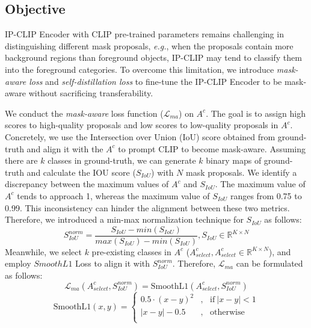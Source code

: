 \subsection{Objective}
\label{sec:Mask-aware tuning}
IP-CLIP Encoder with CLIP pre-trained parameters remains challenging in distinguishing different mask proposals, \textit{e.g.}, when the proposals contain more background regions than foreground objects, IP-CLIP may tend to classify them into the foreground categories. To overcome this limitation, we introduce \textit{mask-aware loss} and \textit{self-distillation loss} to fine-tune the IP-CLIP Encoder to be mask-aware without sacrificing transferability. 

We conduct the \textit{mask-aware} loss function ($\mathcal{L}_{ma}$) on $A^c$.  The goal is to assign high scores to high-quality proposals and low scores to low-quality proposals in $A^c$. Concretely, we use the Intersection over Union (IoU) score obtained from ground-truth and align it with the $A^c$ to prompt CLIP to become mask-aware. Assuming there are $k$ classes in ground-truth, we can generate $k$ binary maps of ground-truth and calculate the IOU score ($S_{IoU}$) with $N$ mask proposals. We identify a discrepancy between the maximum values of $A^c$ and $S_{IoU}$. The maximum value of $A^c$ tends to approach 1, whereas the maximum value of $S_{IoU}$ ranges from 0.75 to 0.99. This inconsistency can hinder the alignment between these two metrics. Therefore, we introduced a min-max normalization technique for $S_{IoU}$ as follows:
\begin{equation}
S_{IoU}^{norm} = \frac{S_{IoU} - min(S_{IoU})}{max(S_{IoU}) - min(S_{IoU})},  S_{IoU}\in \mathbb{R}^{K \times N}
\end{equation}
Meanwhile, we select $k$ pre-existing classes in $A^c$ ($A^c_{select}, A^c_{select}\in \mathbb{R}^{K \times N}$), and employ $SmoothL1$ Loss to align it with $S_{IoU}^{norm}$. Therefore, $\mathcal{L}_{ma}$ can be formulated as follows:
\begin{equation}
\mathcal{L}_{ma}(A^c_{select}, S_{IoU}^{norm}) = \mathrm{SmoothL1} (A^c_{select}, S_{IoU}^{norm})
\end{equation}
\begin{equation}
\mathrm{SmoothL1}(x, y) = \left\{
\begin{aligned}
 0.5\cdot (x - y)^2  &, ~~~ \mathrm{if} ~ |x - y| < 1\\
|x - y| - 0.5  &, ~~~ \mathrm{otherwise} ~ \\
\end{aligned}
\right.
\end{equation}

